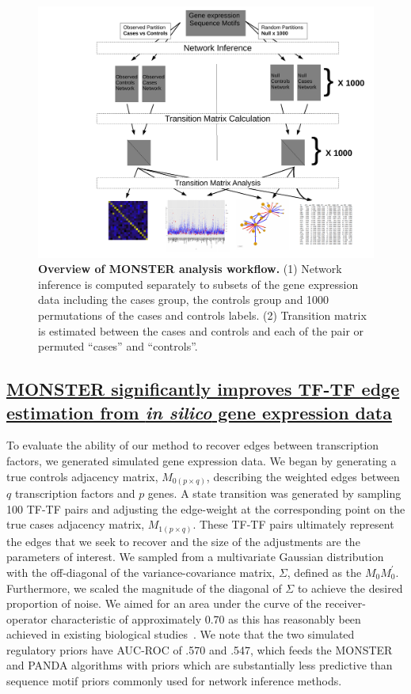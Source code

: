 \documentclass[english]{article}
\begin{document}
\begin{figure}
\centering{}\includegraphics[width=0.8\columnwidth]{figures/workflow_diagram}\caption{\textbf{Overview of MONSTER analysis workflow.} (1) Network inference
is computed separately to subsets of the gene expression data including
the cases group, the controls group and 1000 permutations of the cases
and controls labels. (2) Transition matrix is estimated between the
cases and controls and each of the pair or permuted ``cases'' and
``controls''.}
\end{figure}



\subsection*{\uline{MONSTER significantly improves TF-TF edge estimation from
}\emph{\uline{in silico}}\uline{ gene expression data} }

To evaluate the ability of our method to recover edges between transcription
factors, we generated simulated gene expression data. We began by
generating a true controls adjacency matrix, $M_{0\left(p\times q\right)}$,
describing the weighted edges between $q$ transcription factors and
$p$ genes. A state transition was generated by sampling 100 TF-TF
pairs and adjusting the edge-weight at the corresponding point on
the true cases adjacency matrix, $M_{1\left(p\times q\right)}$. These
TF-TF pairs ultimately represent the edges that we seek to recover
and the size of the adjustments are the parameters of interest. We
sampled from a multivariate Gaussian distribution with the off-diagonal
of the variance-covariance matrix, $\Sigma$, defined as the $M_{0}M_{0}^{\prime}$.
Furthermore, we scaled the magnitude of the diagonal of $\Sigma$
to achieve the desired proportion of noise. We aimed for an area under
the curve of the receiver-operator characteristic of approximately
0.70 as this has reasonably been achieved in existing biological studies~\cite{glass2013passing}.
We note that the two simulated regulatory priors have AUC-ROC of .570
and .547, which feeds the MONSTER and PANDA algorithms with priors
which are substantially less predictive than sequence motif priors
commonly used for network inference methods.
\end{document}
